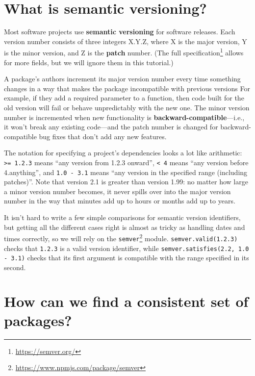 \documentclass[krantzl]{krantz}
\newcommand{\glossref}[1]{\textbf{#1}}
\newcommand{\hreffoot}[2]{{#1}\footnote{\href{#2}{#2}}}
\begin{document}
\section{What is semantic versioning?}\label{package-manager-semver}


Most software projects use \glossref{semantic versioning} for software releases.
Each version number consists of three integers X.Y.Z,
where X is the major version,
Y is the minor version,
and Z is the \glossref{patch} number.
(The \hreffoot{full specification}{https://semver.org/} allows for more fields,
but we will ignore them in this tutorial.)


A package’s authors increment its major version number
every time something changes in a way that makes the package incompatible with previous versions
For example,
if they add a required parameter to a function,
then code built for the old version will fail or behave unpredictably with the new one.
The minor version number is incremented when new functionality
is \glossref{backward-compatible}—i.e.,
it won’t break any existing code—and the patch number is changed
for backward-compatible bug fixes that don’t add any new features.


The notation for specifying a project’s dependencies looks a lot like arithmetic:
\texttt{>= 1.2.3} means “any version from 1.2.3 onward”,
\texttt{< 4} means “any version before 4.anything”,
and \texttt{1.0 - 3.1} means “any version in the specified range (including patches)”.
Note that version 2.1 is greater than version 1.99:
no matter how large a minor version number becomes,
it never spills over into the major version number
in the way that minutes add up to hours or months add up to years.


It isn’t hard to write a few simple comparisons for semantic version identifiers,
but getting all the different cases right is almost as tricky as handling dates and times correctly,
so we will rely on the \hreffoot{\texttt{semver}}{https://www.npmjs.com/package/semver} module.
\texttt{semver.valid({\textquotesingle}1.2.3{\textquotesingle})} checks that \texttt{1.2.3} is a valid version identifier,
while \texttt{semver.satisfies({\textquotesingle}2.2{\textquotesingle}, {\textquotesingle}1.0 - 3.1{\textquotesingle})} checks that its first argument
is compatible with the range specified in its second.

\section{How can we find a consistent set of packages?}\label{package-manager-consistent}
\end{document}
